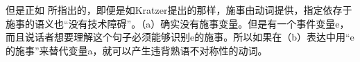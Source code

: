     但是正如 \citet{Wechsler2005a}所指出的，即便是如Kratzer提出的那样，施事由动词提供，指定依存于施事的语义也“没有技术障碍”。（a）确实没有施事变量。但是有一个事件变量e，而且说话者想要理解这个句子必须能够识别e的施事。所以如果在（b）表达中用“e的施事”来替代变量a，就可以产生违背熟语不对称性的动词。

